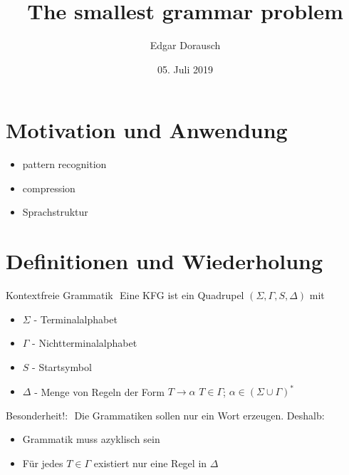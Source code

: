 \documentclass[xcolor=dvipsnames]{beamer}
\title{The smallest grammar problem}
\date{05. Juli 2019}
\author{Edgar Dorausch}
\begin{document}
\maketitle

\newcommand{\Gap}{$ $ \linebreak}
\newcommand{\FrameName}{
	\ifthenelse{\equal{\subsecname}{}}{
		\secname
	}{
		\secname \thinspace -\thinspace\subsecname
	}
}

\newcommand{\Fresh}{\ddagger}


\section{Motivation und Anwendung}

\begin{frame}{\FrameName}
	\begin{itemize}[<+->]
		\item pattern recognition
		\item compression
		\item Sprachstruktur
	\end{itemize}
\end{frame}

\section{Definitionen und Wiederholung}
\begin{frame}{\FrameName}
	\begin{block}{Kontextfreie Grammatik}
		\Gap
		Eine KFG ist ein Quadrupel $(\Sigma,\Gamma,S,\Delta)$ mit
		\begin{itemize}
			\item $\Sigma$ - Terminalalphabet
			\item $\Gamma$ - Nichtterminalalphabet
			\item $S$ - Startsymbol
			\item $\Delta$ - Menge von Regeln der Form $T\rightarrow\alpha$\linebreak
			$T \in \Gamma$;
			$\alpha \in (\Sigma \cup \Gamma)^\ast$
		\end{itemize}
	\end{block}
	
\end{frame}

\begin{frame}{\FrameName}
\begin{alert}{Besonderheit!:}
	\Gap
	Die Grammatiken sollen nur ein Wort erzeugen. Deshalb:
	\begin{itemize}
		
		\item Grammatik muss azyklisch sein
		\item Für jedes $T \in \Gamma$ existiert nur eine Regel in $\Delta$
	\end{itemize}
\end{alert}
\end{frame}
\end{document}
